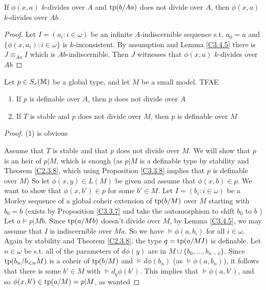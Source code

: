 \documentclass[11pt]{article}
\begin{document}
\begin{corollary}[]
If \(\phi(x,a)\) \(k\)-divides over \(A\) and \(\operatorname{tp}(b/Aa)\) does not divide over \(A\),
then \(\phi(x,a)\) \(k\)-divides over \(Ab\)
\end{corollary}

\begin{proof}
Let \(I=(a_i:i\in\omega)\) be an infinite \(A\)-indiscernible sequence s.t. \(a_0=a\)
and \(\{\phi(x,a_i):i\in\omega\}\) is \(k\)-inconsistent. By assumption and Lemma \ref{C3.4.5} there
is \(J\equiv_{Aa}I\) which is \(Ab\)-indiscernible. Then \(J\) witnesses
that \(\phi(x,a)\) \(k\)-divides over \(Ab\)
\end{proof}

\begin{proposition}[]
\label{C3.4.8}
Let \(p\in S_x(\mathbb{M})\) be a global type, and let \(M\) be a small model. TFAE
\begin{enumerate}
\item If \(p\) is definable over \(A\), then \(p\) does not divide over \(A\)
\item If \(T\) is stable and \(p\) does not divide over \(M\), then \(p\) is definable over \(M\)
\end{enumerate}
\end{proposition}

\begin{proof}
(1) is obvious

Assume that \(T\) is stable and that \(p\) does not divide over \(M\).
We will show that \(p\) is an heir of \(p|M\), which is enough (as \(p|M\) is a definable type
by stability and Theorem \ref{C2.3.8}, which using Proposition \ref{C3.3.8} implies that \(p\) is
definable over \(M\))
So let \(\phi(x,y)\in L(M)\) be given and assume that \(\phi(x,b)\in p\). We want to show
that \(\phi(x,b')\in p\) for some \(b'\in M\).
Let \(I=(b_i:i\in\omega)\) be a Morley sequence of a global coheir extension of \(\operatorname{tp}(b/M)\) over \(M\)
starting with \(b_0=b\) (exists by Proposition \ref{C3.3.7} and take the automorphism to
shift \(b_0\) to \(b\) )
Let \(a\vDash p|Mb\). Since \(\operatorname{tp}(a/Mb)\) doesn't divide over \(M\), by Lemma \ref{C3.4.5}, we may
assume that \(I\) is indiscernible over \(Ma\).
So we have \(\vDash\phi(a,b_i)\) for all \(i\in\omega\). Again by stability and Theorem \ref{C2.3.8}, the
type \(q=\operatorname{tp}(a/MI)\) is definable. Let \(n\in\omega\) be s.t. all of the parameters of \(d\phi(y)\) are
in \(M\cup\{b_0,\dots,b_{n-1}\}\). Since \(\operatorname{tp}(b_n/b_{<n}M)\) is a coheir of \(\operatorname{tp}(b/M)\)
and \(\vDash d\phi(b_n)\) (as \(\vDash\phi(a,b_n)\)), it follows that there is some \(b'\in M\)
with \(\vDash d_q\phi(b')\). This implies that \(\vDash\phi(a,b')\), and so \(\phi(x,b')\in\operatorname{tp}(a/M)=p|M\), as wanted
\end{proof}
\end{document}
